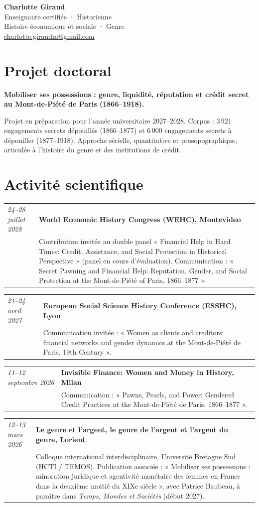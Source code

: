 \documentclass[11pt,a4paper]{article}
\makeatletter
\newcommand{\entry}[3]{\noindent\begin{tabularx}{\textwidth}{@{}>{\raggedright\arraybackslash}p{2.65cm}X@{}}\textit{#1}&\textbf{#2}\\& #3\end{tabularx}\par\vspace{3pt}}
\makeatother
\begin{document}
\begin{center}
{\LARGE\bfseries Charlotte Giraud}\\[5pt]
Enseignante certifiée · Historienne\\
Histoire économique et sociale · Genre\\[4pt]
\href{mailto:charlotte.giraudm@gmail.com}{charlotte.giraudm@gmail.com}
\end{center}

\section{Projet doctoral}
\textbf{Mobiliser ses possessions : genre, liquidité, réputation et crédit secret au Mont-de-Piété de Paris (1866--1918).}

Projet en préparation pour l’année universitaire 2027--2028. Corpus : 3\,921 engagements secrets dépouillés (1866--1877) et 6\,000 engagements secrets à dépouiller (1877--1918). Approche sérielle, quantitative et prosopographique, articulée à l’histoire du genre et des institutions de crédit.

\section{Activité scientifique}
\entry{24--28 juillet 2028}{World Economic History Congress (WEHC), Montevideo}{Contribution invitée au double panel « Financial Help in Hard Times: Credit, Assistance, and Social Protection in Historical Perspective » (panel en cours d’évaluation). Communication : « Secret Pawning and Financial Help: Reputation, Gender, and Social Protection at the Mont-de-Piété of Paris, 1866--1877 ».}
\entry{21--24 avril 2027}{European Social Science History Conference (ESSHC), Lyon}{Communication invitée : « Women as clients and creditors: financial networks and gender dynamics at the Mont-de-Piété de Paris, 19th Century ».}
\entry{11--12 septembre 2026}{Invisible Finance: Women and Money in History, Milan}{Communication : « Pawns, Pearls, and Power: Gendered Credit Practices at the Mont-de-Piété de Paris, 1866--1877 ».}
\entry{12--13 mars 2026}{Le genre et l’argent, le genre de l’argent et l’argent du genre, Lorient}{Colloque international interdisciplinaire, Université Bretagne Sud (HCTI / TEMOS). Publication associée : « Mobiliser ses possessions : minoration juridique et agentivité monétaire des femmes en France dans la deuxième moitié du XIXe siècle », avec Patrice Baubeau, à paraître dans \textit{Temps, Mondes et Sociétés} (début 2027).}
\end{document}
